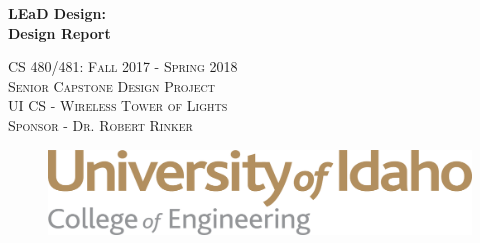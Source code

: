 \documentclass[12pt]{article}
\begin{document}
	\begin{titlepage}
		\centering	
    
    \begin{figure}[h]
      \centering
    \end{figure} 
  
  {\huge\bfseries \textcolor{myRed}{L}\textcolor{myGreen}{E}a\textcolor{myBlue}{D} Design: \\ Design Report\par}
    
    \title{}
    \date{\vspace{-5ex}} %
    \author{%
    	\\Budget Director\\beeh9036@vandals.uidaho.edu
    	\and {}\\Documenter\\butl6046@vandals.uidaho.edu
    	\and \\ \\Client Liaison\\dors7905@vandals.uidaho.edu
    	\and \\ \\Designer\\mart2659@vandals.uidaho.edu
    }
    \let\newpage\relax\maketitle %
    \maketitle		
    
    \vspace{4cm} 
    
    {\scshape\Large 
      CS 480/481: Fall 2017 - Spring 2018 \\
      Senior Capstone Design Project \\ 
      UI CS - Wireless Tower of Lights \\
      Sponsor - Dr. Robert Rinker
      \par}
    
     \vspace{3cm} 
    
    \begin{figure}[h]
      \centering
      \includegraphics[width=0.7\linewidth]{assets/uislogan.png}
    \end{figure} 
  
		\vfill		
	\end{titlepage}
\end{document}
